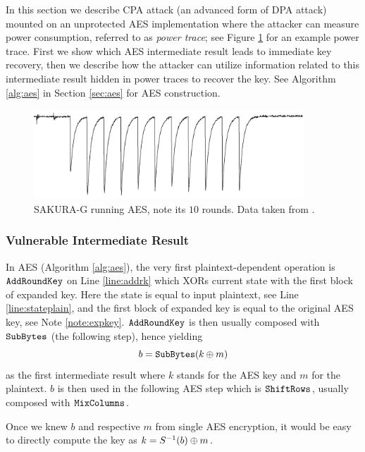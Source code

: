 In this section we describe CPA attack (an advanced form of DPA attack) mounted on an unprotected AES implementation where the attacker can measure power consumption, referred to as {\em power trace}; see Figure \ref{fig:powertrace} for an example power trace. First we show which AES intermediate result leads to immediate key recovery, then we describe how the attacker can utilize information related to this intermediate result hidden in power traces to recover the key. See Algorithm \ref{alg:aes} in Section \ref{sec:aes} for AES construction.

\begin{figure}[h]
\begin{center}
	\includegraphics[width=0.9\textwidth]{./figures/power_trace/power_trace.png}
	\caption{SAKURA-G running AES, note its $10$ rounds. Data taken from \cite{exampletraces}.}
	\label{fig:powertrace}
\end{center}
\end{figure}

\subsubsection{Vulnerable Intermediate Result}
	
	In AES (Algorithm \ref{alg:aes}), the very first plaintext-dependent operation is $\texttt{AddRoundKey}$ on Line \ref{line:addrk} which XORs current state with the first block of expanded key. Here the state is equal to input plaintext, see Line \ref{line:stateplain}, and the first block of expanded key is equal to the original AES key, see Note \ref{note:expkey}. $\texttt{AddRoundKey}$ is then usually composed with $\texttt{SubBytes}$ (the following step), hence yielding
	\begin{equation}
		b = \texttt{SubBytes}(k\oplus m) \label{eq:byprod}
	\end{equation}
	as the first intermediate result where $k$ stands for the AES key and $m$ for the plaintext. $b$ is then used in the following AES step which is $\texttt{ShiftRows}$, usually composed with $\texttt{MixColumns}$.
		
	Once we knew $b$ and respective $m$ from single AES encryption, it would be easy to directly compute the key as $k = S^{-1}(b)\oplus m$.

